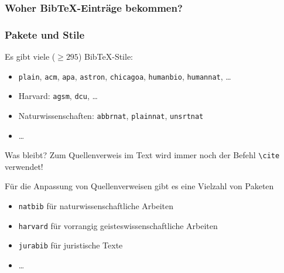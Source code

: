 \begin{frame}[fragile]
  \frametitle{Woher Bib\TeX-Einträge bekommen?}

  \centering


\end{frame}

\begin{frame}[fragile]
  \frametitle{Pakete und Stile}
  \onslide<+->

  Es gibt viele ($\geq 295$) Bib\TeX-Stile:
  \begin{itemize}
  \item<+-> \texttt{plain}, \texttt{acm}, \texttt{apa}, \texttt{astron},
    \texttt{chicagoa}, \texttt{humanbio}, \texttt{humannat}, \dots
  \item<+-> Harvard: \texttt{agsm}, \texttt{dcu}, \dots
  \item<+-> Naturwissenschaften: \texttt{abbrnat}, \texttt{plainnat},
    \texttt{unsrtnat}
  \item<+-> \dots
  \end{itemize}

  \onslide<+->

  \begin{block}{Was bleibt?}
    Zum Quellenverweis im Text wird immer noch der Befehl \lstinline|\cite|
    verwendet!
  \end{block}

  \onslide<+->

  Für die Anpassung von Quellenverweisen gibt es eine Vielzahl von Paketen

  \begin{itemize}
  \item<+-> \lstinline|natbib| für naturwissenschaftliche Arbeiten
  \item<+-> \lstinline|harvard| für vorrangig geisteswissenschaftliche Arbeiten
  \item<+-> \lstinline|jurabib| für juristische Texte
  \item<+-> \dots
  \end{itemize}

\end{frame}

